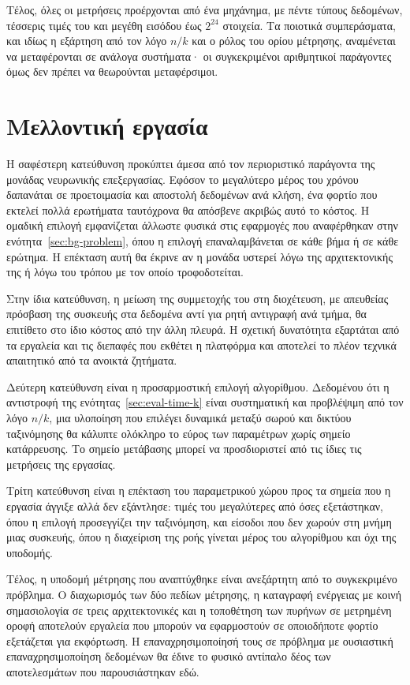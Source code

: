 Τέλος, όλες οι μετρήσεις προέρχονται από ένα μηχάνημα, με πέντε τύπους δεδομένων,
τέσσερις τιμές του  και μεγέθη εισόδου έως $2^{24}$ στοιχεία. Τα ποιοτικά
συμπεράσματα, και ιδίως η εξάρτηση από τον λόγο $n/k$ και ο ρόλος του ορίου
μέτρησης, αναμένεται να μεταφέρονται σε ανάλογα συστήματα· οι συγκεκριμένοι
αριθμητικοί παράγοντες όμως δεν πρέπει να θεωρούνται μεταφέρσιμοι.

\section{Μελλοντική εργασία}
\label{sec:concl-future}

Η σαφέστερη κατεύθυνση προκύπτει άμεσα από τον περιοριστικό παράγοντα της μονάδας
νευρωνικής επεξεργασίας. Εφόσον το μεγαλύτερο μέρος του χρόνου δαπανάται σε
προετοιμασία και αποστολή δεδομένων ανά κλήση, ένα φορτίο που εκτελεί πολλά
ερωτήματα  ταυτόχρονα θα απόσβενε ακριβώς αυτό το κόστος. Η ομαδική
επιλογή εμφανίζεται άλλωστε φυσικά στις εφαρμογές που αναφέρθηκαν στην
ενότητα~\ref{sec:bg-problem}, όπου η επιλογή επαναλαμβάνεται σε κάθε βήμα ή σε
κάθε ερώτημα. Η επέκταση αυτή θα έκρινε αν η μονάδα υστερεί λόγω της
αρχιτεκτονικής της ή λόγω του τρόπου με τον οποίο τροφοδοτείται.

Στην ίδια κατεύθυνση, η μείωση της συμμετοχής του  στη διοχέτευση, με
απευθείας πρόσβαση της συσκευής στα δεδομένα αντί για ρητή αντιγραφή ανά τμήμα,
θα επιτίθετο στο ίδιο κόστος από την άλλη πλευρά. Η σχετική δυνατότητα εξαρτάται
από τα εργαλεία και τις διεπαφές που εκθέτει η πλατφόρμα και αποτελεί το πλέον
τεχνικά απαιτητικό από τα ανοικτά ζητήματα.

Δεύτερη κατεύθυνση είναι η προσαρμοστική επιλογή αλγορίθμου. Δεδομένου ότι η
αντιστροφή της ενότητας~\ref{sec:eval-time-k} είναι συστηματική και προβλέψιμη
από τον λόγο $n/k$, μια υλοποίηση που επιλέγει δυναμικά μεταξύ σωρού και δικτύου
ταξινόμησης θα κάλυπτε ολόκληρο το εύρος των παραμέτρων χωρίς σημείο κατάρρευσης.
Το σημείο μετάβασης μπορεί να προσδιοριστεί από τις ίδιες τις μετρήσεις της
εργασίας.

Τρίτη κατεύθυνση είναι η επέκταση του παραμετρικού χώρου προς τα σημεία που η
εργασία άγγιξε αλλά δεν εξάντλησε: τιμές του  μεγαλύτερες από όσες
εξετάστηκαν, όπου η επιλογή προσεγγίζει την ταξινόμηση, και είσοδοι που δεν
χωρούν στη μνήμη μιας συσκευής, όπου η διαχείριση της ροής γίνεται μέρος του
αλγορίθμου και όχι της υποδομής.

Τέλος, η υποδομή μέτρησης που αναπτύχθηκε είναι ανεξάρτητη από το συγκεκριμένο
πρόβλημα. Ο διαχωρισμός των δύο πεδίων μέτρησης, η καταγραφή ενέργειας με κοινή
σημασιολογία σε τρεις αρχιτεκτονικές και η τοποθέτηση των πυρήνων σε μετρημένη
οροφή αποτελούν εργαλεία που μπορούν να εφαρμοστούν σε οποιοδήποτε φορτίο
εξετάζεται για εκφόρτωση. Η επαναχρησιμοποίησή τους σε πρόβλημα με ουσιαστική
επαναχρησιμοποίηση δεδομένων θα έδινε το φυσικό αντίπαλο δέος των αποτελεσμάτων
που παρουσιάστηκαν εδώ.
